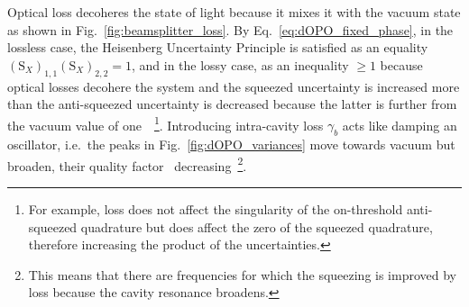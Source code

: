 Optical loss decoheres the state of light because it mixes it with the vacuum state as shown in Fig.~\ref{fig:beamsplitter_loss}.
By Eq.~\ref{eq:dOPO_fixed_phase}, in the lossless case, the Heisenberg Uncertainty Principle is satisfied as an equality  $(\text{S}_X)_{1,1}(\text{S}_X)_{2,2}=1$, and in the lossy case, as an inequality $\geq1$ because optical losses decohere the system and the squeezed uncertainty is increased more than the anti-squeezed uncertainty is decreased because the latter is further from the vacuum value of one~\cite{}~\footnote{For example, loss does not affect the singularity of the on-threshold anti-squeezed quadrature but does affect the zero of the squeezed quadrature, therefore increasing the product of the uncertainties.}.
Introducing intra-cavity loss $\gamma_b$ acts like damping an oscillator, i.e.\ the peaks in Fig.~\ref{fig:dOPO_variances} move towards vacuum but broaden, their quality factor~\cite{} decreasing~\footnote{This means that there are frequencies for which the squeezing is improved by loss because the cavity resonance broadens.}.
